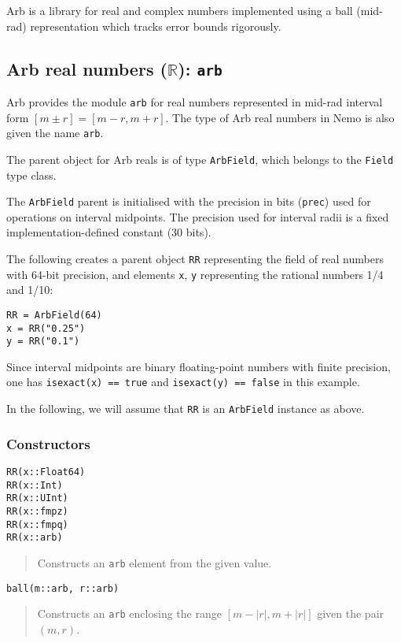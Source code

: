 \documentclass[a4paper,10pt]{article}
\newcommand{\R}{\mathbb{R}}
\newcommand{\code}{\lstinline}
\newcommand{\desc}[1]{\vspace{-3mm}\begin{quote}#1\end{quote}}
\begin{document}
{{Arb is a library for real and complex numbers implemented using
a ball (mid-rad) representation which tracks error bounds rigorously.

\subsection{Arb real numbers ($\R$): \code|arb|}

Arb provides the module \code{arb} for real numbers represented
in mid-rad interval form $[m \pm r] = [m-r, m+r]$. The type of Arb real
numbers in Nemo is also given the name \code{arb}.

The parent object for Arb reals is of type \code{ArbField}, which
belongs to the \code{Field} type class.

The \code{ArbField} parent is initialised with the precision in bits (\code{prec})
used for operations on interval midpoints. The precision used for
interval radii is a fixed implementation-defined constant (30 bits).

The following creates a parent object \code{RR} representing
the field of real numbers with 64-bit precision, and elements
\code{x}, \code{y} representing the rational numbers 1/4 and 1/10:

\begin{lstlisting}
RR = ArbField(64)
x = RR("0.25")
y = RR("0.1")
\end{lstlisting}

Since interval midpoints are binary floating-point numbers with
finite precision, one has
\code{isexact(x) == true} and \code{isexact(y) == false} in this example.

In the following, we will assume that \code{RR} is an \code{ArbField}
instance as above.

\subsubsection{Constructors}

\begin{lstlisting}
RR(x::Float64)
RR(x::Int)
RR(x::UInt)
RR(x::fmpz)
RR(x::fmpq)
RR(x::arb)
\end{lstlisting}

\desc{Constructs an \code{arb} element from the given value.}

\begin{lstlisting}
ball(m::arb, r::arb)
\end{lstlisting}

\desc{Constructs an \code{arb} enclosing the range $[m-|r|, m+|r|]$ given
the pair $(m, r)$.}

}}
\end{document}
